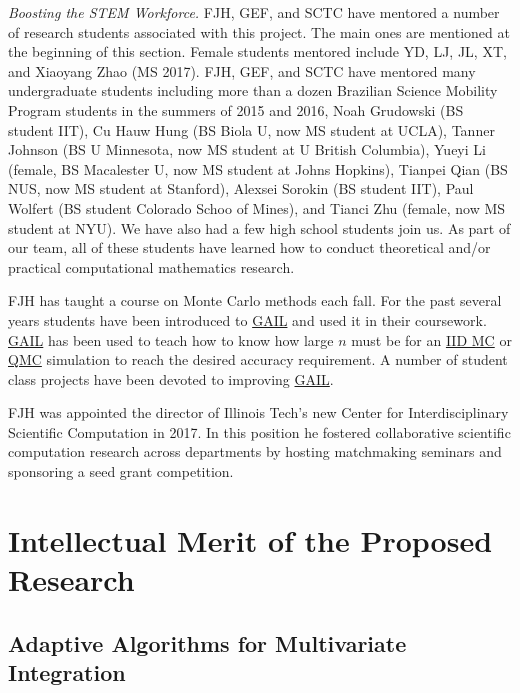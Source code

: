 \documentclass[11pt]{NSFamsart}
\newcommand{\GAIL}{\hyperlink{GAILlink}{GAIL}\xspace}
\newcommand{\QMC}{\hyperlink{QMClink}{QMC}\xspace}
\newcommand{\IIDMC}{\hyperlink{IIDMClink}{IID MC}\xspace}
\begin{document}
\emph{Boosting the STEM Workforce.} FJH, GEF, and SCTC have mentored a number of 
research students associated with this project.  The main ones are mentioned at the beginning of 
this section.  Female students mentored include YD, LJ, JL, XT, and Xiaoyang Zhao (MS 2017).   FJH, GEF, and SCTC have mentored many undergraduate students including more than a dozen 
Brazilian Science Mobility Program students in the summers of 2015 and 2016, Noah Grudowski (BS student IIT), Cu Hauw Hung (BS Biola U, now MS student at UCLA), Tanner Johnson (BS U Minnesota, now MS student at U British Columbia), Yueyi Li (female, BS Macalester U, now MS student at Johns Hopkins), Tianpei Qian (BS NUS, now MS student at Stanford), Alexsei Sorokin (BS student IIT), Paul Wolfert (BS student Colorado Schoo of Mines), and 
Tianci Zhu (female, now MS student at NYU).  We have also had a few high school students join us. As part of our team, all of
these students have learned how to conduct theoretical and/or practical computational mathematics research.

FJH has taught a course on Monte Carlo methods each fall.  For the past several years students 
have been introduced to \GAIL and used it in their coursework.  \GAIL has been used to teach how 
to know how large $n$ must be for an \IIDMC or \QMC simulation to reach the desired accuracy 
requirement.  A number of student class projects have been devoted to improving \GAIL.

FJH was appointed the director of Illinois Tech's new Center for Interdisciplinary 
Scientific Computation in 2017.  In this position he fostered collaborative scientific computation 
research across departments by hosting matchmaking seminars and sponsoring a seed grant 
competition. %







\section{Intellectual Merit of the Proposed Research} \label{sec:Proposed}




\subsection{Adaptive Algorithms for Multivariate Integration}\label{SectMultiInt}
\end{document}
